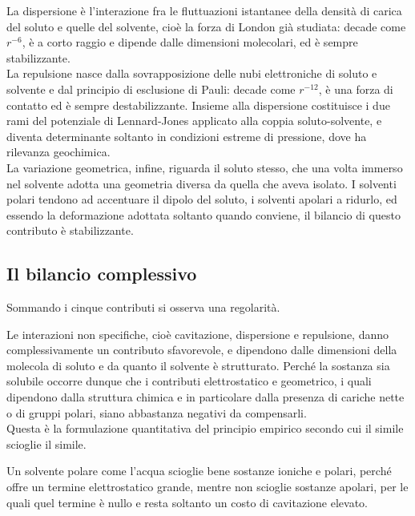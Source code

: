 La dispersione è l'interazione fra le fluttuazioni istantanee della densità di carica del soluto e quelle del solvente, cioè la forza di London già studiata: decade come $r^{-6}$, è a corto raggio e dipende dalle dimensioni molecolari, ed è sempre stabilizzante.\\

La repulsione nasce dalla sovrapposizione delle nubi elettroniche di soluto e solvente e dal principio di esclusione di Pauli: decade come $r^{-12}$, è una forza di contatto ed è sempre destabilizzante.
Insieme alla dispersione costituisce i due rami del potenziale di Lennard-Jones applicato alla coppia soluto-solvente, e diventa determinante soltanto in condizioni estreme di pressione, dove ha rilevanza geochimica.\\

La variazione geometrica, infine, riguarda il soluto stesso, che una volta immerso nel solvente adotta una geometria diversa da quella che aveva isolato.
I solventi polari tendono ad accentuare il dipolo del soluto, i solventi apolari a ridurlo, ed essendo la deformazione adottata soltanto quando conviene, il bilancio di questo contributo è stabilizzante.

\subsection{Il bilancio complessivo}

Sommando i cinque contributi si osserva una regolarità.

Le interazioni non specifiche, cioè cavitazione, dispersione e repulsione, danno complessivamente un contributo sfavorevole, e dipendono dalle dimensioni della molecola di soluto e da quanto il solvente è strutturato.
Perché la sostanza sia solubile occorre dunque che i contributi elettrostatico e geometrico, i quali dipendono dalla struttura chimica e in particolare dalla presenza di cariche nette o di gruppi polari, siano abbastanza negativi da compensarli.\\

Questa è la formulazione quantitativa del principio empirico secondo cui il simile scioglie il simile.

Un solvente polare come l'acqua scioglie bene sostanze ioniche e polari, perché offre un termine elettrostatico grande, mentre non scioglie sostanze apolari, per le quali quel termine è nullo e resta soltanto un costo di cavitazione elevato.

